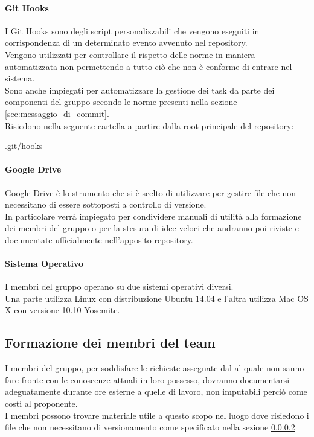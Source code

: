 			\paragraph{Git Hooks}
			I Git Hooks sono degli script personalizzabili che vengono eseguiti in corrispondenza di un determinato evento avvenuto nel repository. \\
			Vengono utilizzati per controllare il rispetto delle norme in maniera automatizzata non permettendo a tutto ciò che non è conforme di entrare nel sistema. \\
			Sono anche impiegati per automatizzare la gestione dei task da parte dei componenti del gruppo secondo le norme presenti nella sezione \ref{sec:messaggio_di_commit}. \\
			Risiedono nella seguente cartella a partire dalla root principale del repository:
				\begin{center}
					.git/hooks
				\end{center}
			\paragraph{Google Drive} \label{sec:google_drive}
			Google Drive è lo strumento che si è scelto di utilizzare per gestire file che non necessitano di essere sottoposti a controllo di versione. \\
			In particolare verrà impiegato per condividere manuali di utilità alla formazione dei membri del gruppo o per la stesura di idee veloci che andranno poi riviste e documentate ufficialmente nell'apposito repository.
			\paragraph{Sistema Operativo}
			I membri del gruppo operano su due sistemi operativi diversi. \\
			Una parte utilizza Linux con distribuzione Ubuntu 14.04 e l'altra utilizza Mac OS X con versione 10.10 Yosemite.

	\subsection{Formazione dei membri del team}
	I membri del gruppo, per soddisfare le richieste assegnate dal \roleProjectManager{} al quale non sanno fare fronte con le conoscenze attuali in loro possesso, dovranno documentarsi adeguatamente durante ore esterne a quelle di lavoro, non imputabili perciò come costi al proponente.\\
	I membri possono trovare materiale utile a questo scopo nel luogo dove risiedono i file che non necessitano di versionamento come specificato nella sezione \ref{sec:google_drive}